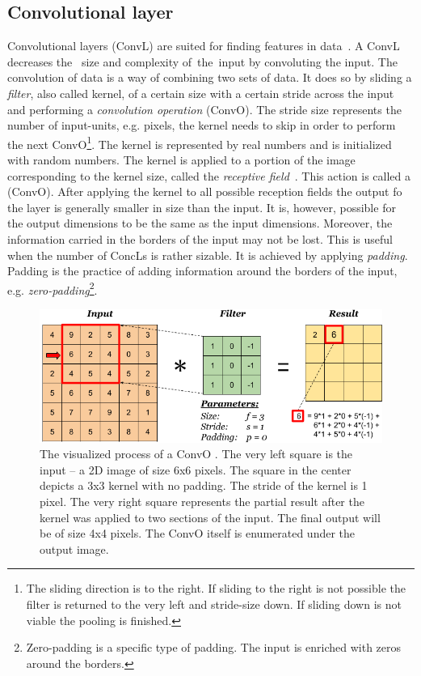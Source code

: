\subsection{Convolutional layer}\label{convolutionalLayers}
Convolutional layers (ConvL) are suited for finding features in data~\cite{CNN}. A ConvL decreases the~ size and complexity of~the~input by convoluting the input. The convolution of data is a way of combining two sets of data.  It does so by sliding a \textit{filter}, also called kernel, of a certain size with a certain stride across the input and performing a \textit{convolution operation} (ConvO). The stride size represents the number of input-units, e.g. pixels, the kernel needs to skip in order to perform the next ConvO\footnote{The sliding direction is to the right. If sliding to the right is not possible the filter is returned to the very left and stride-size down. If sliding down is not viable the pooling is finished.}. The kernel is represented by real numbers and is initialized with random numbers. The kernel is applied to a portion of the image corresponding to the kernel size, called the \textit{receptive field}~\cite{receptiveField}. This action is called a (ConvO). After applying the kernel to all possible reception fields the output fo the layer is generally smaller in size than the input. It is, however, possible for the output dimensions to be the same as the input dimensions. Moreover, the information carried in the borders of the input may not be lost. This is useful when the number of ConcLs is rather sizable. It is achieved by applying \textit{padding}. Padding is the practice of adding information around the borders of the input, e.g. \textit{zero-padding}\footnote{Zero-padding is a specific type of padding. The input is enriched with zeros around the borders.}.
\begin{figure}[ht!]
  \centering
  \includegraphics[width=\textwidth]{Images/convolution-operation.png}
  \caption{The visualized process of a ConvO \cite{convolutionOperationVisualization}. The very left square is the input -- a 2D image of size 6x6 pixels. The square in the center depicts a 3x3 kernel with no padding. The stride of the kernel is 1 pixel. The very right square represents the partial result after the kernel was applied to two sections of the input. The final output will be of size 4x4 pixels. The ConvO itself is enumerated under the output image.} 
  \label{convolutionalLayerVisualization}
\end{figure} 

